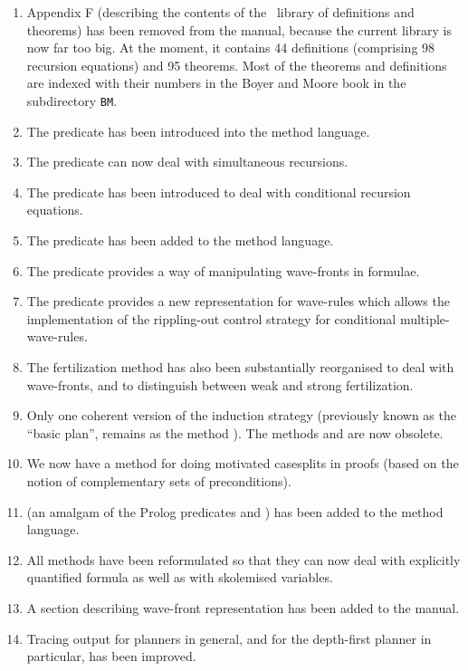 \begin{enumerate}
\item
Appendix F (describing the contents of the \clam\ library of
definitions and theorems) has been removed from the manual, because
the current library is now far too big. At the
moment, it contains 44 definitions (comprising 98 recursion equations)
and 95 theorems. Most of the theorems and definitions are indexed with
their numbers in the Boyer and Moore book \cite{boyerbook} in the
subdirectory {\tt BM}. 
\item
The predicate  has been introduced into the method
language. 
\item
The predicate  can now deal with simultaneous
recursions.
\item
The predicate  has been introduced to deal with
conditional recursion equations. 
\item
The predicate  has been added to the method
language. 
\item
The predicate  provides a way of manipulating
wave-fronts in formulae.
\item
The predicate  provides a new representation for
wave-rules which allows the implementation of the rippling-out control
strategy for conditional multiple-wave-rules.
\item
The fertilization method has also been substantially reorganised to
deal with wave-fronts, and to distinguish between weak and strong
fertilization. 
\item
Only one coherent version of the induction strategy (previously known
as the ``basic plan'', remains as the method ). The
methods  and  are now obsolete. 
\item
We now have a method for doing motivated casesplits in proofs (based
on the notion of complementary sets of preconditions). 
\item
{} (an amalgam of the Prolog predicates
 and ) has been added to the method language. 
\item
All methods have been reformulated so that they can now deal with
explicitly quantified formula as well as with skolemised variables. 
\item
A section describing wave-front representation has been added to the
manual. 
\item
Tracing output for planners in general, and for the depth-first
planner in particular, has been improved. 

\end{enumerate}
